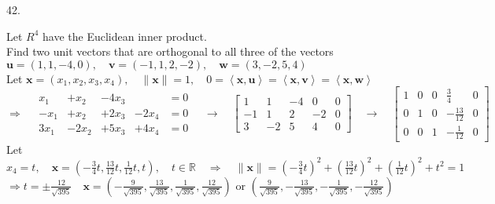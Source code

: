 \documentclass[12pt]{book}
\begin{document}
\begin{CJK}{UTF8}{bsmi}
42. \begin{minipage}[t]{\dimexpr\linewidth}
Let $R^4$ have the Euclidean inner product. \\
Find two unit vectors that are orthogonal to all three of the vectors \\
$\textbf{u}=(1,1,-4,0),\quad\textbf{v}=(-1,1,2,-2),\quad\textbf{w}=(3,-2,5,4)$ \\
Let $\textbf{x}=(x_1,x_2,x_3,x_4),\quad\parallel\textbf{x}\parallel=1,\quad0=\left\langle \textbf{x},\textbf{u} \right\rangle=\left\langle \textbf{x},\textbf{v} \right\rangle=\left\langle \textbf{x},\textbf{w} \right\rangle$ \\
$\displaystyle\Rightarrow\quad\begin{matrix}
x_1  & +  x_2  & -  4x_3 &         & =0 \\
-x_1 & +  x_2  & +  2x_3 & -  2x_4 & =0 \\
3x_1 & -  2x_2 & +  5x_3 & +  4x_4 & =0
\end{matrix}\quad\rightarrow\quad\begin{bmatrix}
1 & 1 & -4 & 0 & 0 \\
-1 & 1 & 2 & -2 & 0 \\
3 & -2 & 5 & 4 & 0
\end{bmatrix}\quad\rightarrow\quad\begin{bmatrix}
1 & 0 & 0 & \frac{3}{4} & 0 \\
0 & 1 & 0 & -\frac{13}{12} & 0 \\
0 & 0 & 1 & -\frac{1}{12} & 0
\end{bmatrix}$ \\
Let $\displaystyle x_4=t,\quad\textbf{x}=(-\frac{3}{4}t,\frac{13}{12}t,\frac{1}{12}t,t),\quad t\in\mathbb{R}\quad\Rightarrow\quad\parallel\textbf{x}\parallel=(-\frac{3}{4}t)^2+(\frac{13}{12}t)^2+(\frac{1}{12}t)^2+t^2=1$ \\
$\displaystyle\Rightarrow t=\pm\frac{12}{\sqrt{395}}\quad\textbf{x}=(-\frac{9}{\sqrt{395}},\frac{13}{\sqrt{395}},\frac{1}{\sqrt{395}},\frac{12}{\sqrt{395}})$ or $\displaystyle(\frac{9}{\sqrt{395}},-\frac{13}{\sqrt{395}},-\frac{1}{\sqrt{395}},-\frac{12}{\sqrt{395}})$
\end{minipage} \\


\end{CJK}
\end{document}
